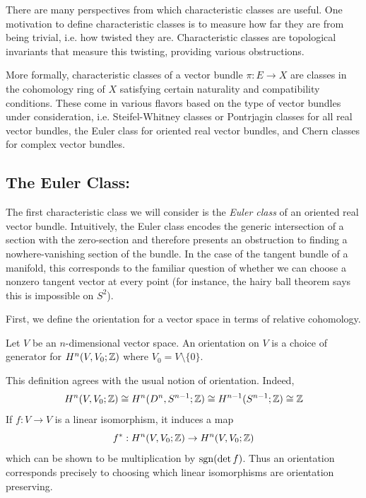 \documentclass[12pt]{article}
\begin{document}
There are many perspectives from which characteristic classes are useful. One motivation to define characteristic classes is to measure how far they are from being trivial, i.e. how twisted they are. Characteristic classes are topological invariants that measure this twisting, providing various obstructions.

More formally, characteristic classes of a vector bundle $\pi: E \to X$ are classes in the cohomology ring of $X$ satisfying certain naturality and compatibility conditions. These come in various flavors based on the type of vector bundles under consideration, i.e. Steifel-Whitney classes or Pontrjagin classes for all real vector bundles, the Euler class for oriented real vector bundles, and Chern classes for complex vector bundles. 

\subsection{The Euler Class:}
The first characteristic class we will consider is the \emph{Euler class} of an oriented real vector bundle. Intuitively, the Euler class encodes the generic intersection of a section with the zero-section and therefore presents an obstruction to finding a nowhere-vanishing section of the bundle. In the case of the tangent bundle of a manifold, this corresponds to the familiar question of whether we can choose a nonzero tangent vector at every point (for instance, the hairy ball theorem says this is impossible on $S^2$).

First, we define the orientation for a vector space in terms of relative cohomology. 
\begin{definition}
    Let $V$ be an $n$-dimensional vector space. An orientation on $V$ is a choice of generator for $H^n(V, V_0; \mathbb Z)$ where $V_0 = V\setminus \{0\}$. 
\end{definition}
\begin{remark}
This definition agrees with the usual notion of orientation. Indeed,
\[ H^n(V,V_0;\mathbb Z) \cong H^n(D^n,S^{n-1};\mathbb Z) \cong H^{n-1}(S^{n-1};\mathbb Z) \cong \mathbb Z  \]
If $f:V \to V$ is a linear isomorphism, it induces a map
\[ f^*:H^n(V,V_0;\mathbb Z) \to H^n(V,V_0;\mathbb Z) \]
which can be shown to be multiplication by $\operatorname{sgn}(\det f)$. Thus an orientation corresponds precisely to choosing which linear isomorphisms are orientation preserving.
\end{remark}
\end{document}
